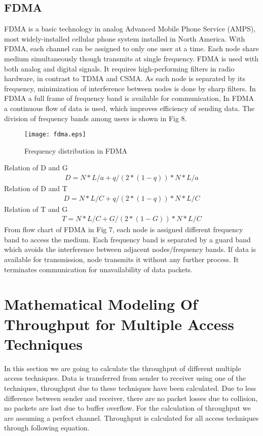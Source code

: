 \documentclass[11pt, conference, compsocconf, onecolumn]{IEEEtran}
\begin{document}
\subsection{FDMA}
FDMA is a basic technology in analog Advanced Mobile Phone Service (AMPS), most widely-installed cellular phone system installed in North America. With FDMA, each channel can be assigned to only one user at a time.
Each node share medium simultaneously though transmits at single frequency. FDMA is used with both analog and digital signals. It requires high-performing filters in radio hardware, in contrast to TDMA and CSMA. As each node is separated by its frequency, minimization of interference between nodes is done by sharp filters. In FDMA a full frame of frequency band is available for communication, In FDMA a continuous flow of data is used, which improves efficiency of sending data. The division of frequency bands among users is shown in Fig 8.
\begin{figure}[!h]
\centering
\caption{Frequency distribution in FDMA}
\texttt{[image: fdma.eps]}
\end{figure}
Relation of D and G
\begin{eqnarray}
D=N*L/a+q/(2*(1-q))*N*L/a
\end{eqnarray}
Relation of D and T
\begin{eqnarray}
D=N*L/C+q/(2*(1-q))*N*L/C
\end{eqnarray}
Relation of T and G
\begin{eqnarray}
T=N*L/C+G/(2*(1-G))*N*L/C
\end{eqnarray}
From flow chart of FDMA in Fig 7, each node is assigned different frequency band to access the medium. Each frequency band is separated by a guard band which avoids the interference between adjacent nodes/frequency bands. If data is available for transmission, node transmits it without any further process. It terminates communication for unavailability of data packets.

\section{Mathematical Modeling Of Throughput for Multiple Access Techniques}
In this section we are going to calculate the throughput of different multiple access techniques. Data is transferred from sender to receiver using one of the techniques, throughput due to these techniques have been calculated. Due to less difference between sender and receiver, there are no packet losses due to collision, no packets are lost due to buffer overflow. For the calculation of throughput we are assuming a perfect channel. Throughput is calculated for all access techniques through following equation.
\end{document}
